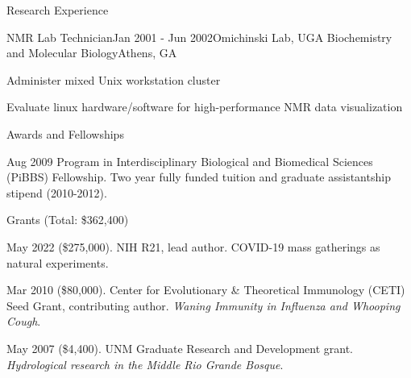 \documentclass{resume} %
\begin{document}
\begin{rSection}{Research Experience}
\begin{rSubsection}{NMR Lab Technician}{Jan 2001 - Jun 2002}{Omichinski Lab, UGA
Biochemistry and Molecular Biology}{Athens, GA}
\item Administer mixed Unix workstation cluster
\item Evaluate linux hardware/software for high-performance NMR data visualization
\end{rSubsection}
\end{rSection}


\begin{rSection}{Awards and Fellowships}
\item Aug 2009 Program in Interdisciplinary Biological and Biomedical Sciences
(PiBBS) Fellowship. Two year fully funded tuition and graduate assistantship
stipend (2010-2012).
\end{rSection}

\begin{rSection}{Grants (Total: \$362,400)}
\item May 2022 (\$275,000). NIH R21, lead author. COVID-19 mass gatherings as natural experiments.
\item Mar 2010 (\$80,000). Center for Evolutionary \& Theoretical Immunology (CETI) Seed
Grant, contributing author. {\em Waning Immunity in Influenza and Whooping Cough}.
\item May 2007 (\$4,400). UNM Graduate Research and Development grant. {\em Hydrological research in the Middle Rio Grande Bosque}. 
\end{rSection}
\end{document}
